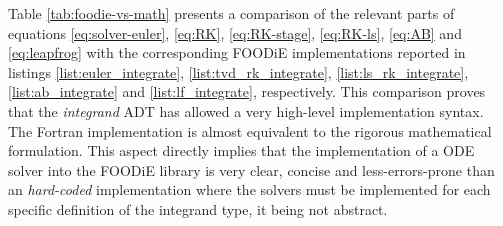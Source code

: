 Table \ref{tab:foodie-vs-math} presents a comparison of the relevant parts of equations \ref{eq:solver-euler}, \ref{eq:RK}, \ref{eq:RK-stage}, \ref{eq:RK-ls}, \ref{eq:AB} and \ref{eq:leapfrog} with the corresponding FOODiE implementations reported in listings \ref{list:euler_integrate}, \ref{list:tvd_rk_integrate}, \ref{list:ls_rk_integrate}, \ref{list:ab_integrate} and \ref{list:lf_integrate}, respectively. This comparison proves that the \emph{integrand} ADT has allowed a very high-level implementation syntax. The Fortran implementation is almost equivalent to the rigorous mathematical formulation. This aspect directly implies that the implementation of a ODE solver into the FOODiE library is very clear, concise and less-errors-prone than an \emph{hard-coded} implementation where the solvers must be implemented for each specific definition of the integrand type, it being not abstract.

